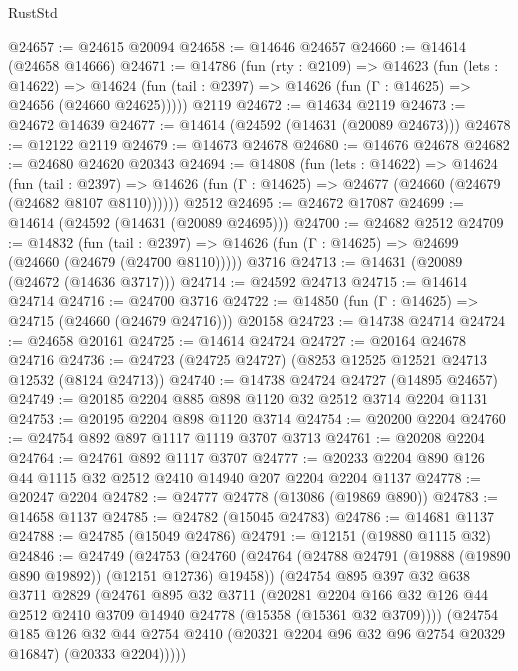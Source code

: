 \begin{lexlean}{RustStd}
\begin{coremodule}
@24657 := @24615 @20094
@24658 := @14646 @24657
@24660 := @14614 (@24658 @14666)
@24671 := @14786
    (fun (rty : @2109) =>
    @14623
      (fun (lets : @14622) =>
      @14624 (fun (tail : @2397) => @14626 (fun (Γ : @14625) => @24656 (@24660 @24625)))))
    @2119
@24672 := @14634 @2119
@24673 := @24672 @14639
@24677 := @14614 (@24592 (@14631 (@20089 @24673)))
@24678 := @12122 @2119
@24679 := @14673 @24678
@24680 := @14676 @24678
@24682 := @24680 @24620 @20343
@24694 := @14808
    (fun (lets : @14622) =>
    @14624
      (fun (tail : @2397) =>
      @14626 (fun (Γ : @14625) => @24677 (@24660 (@24679 (@24682 @8107 @8110))))))
    @2512
@24695 := @24672 @17087
@24699 := @14614 (@24592 (@14631 (@20089 @24695)))
@24700 := @24682 @2512
@24709 := @14832
    (fun (tail : @2397) => @14626 (fun (Γ : @14625) => @24699 (@24660 (@24679 (@24700 @8110)))))
    @3716
@24713 := @14631 (@20089 (@24672 (@14636 @3717)))
@24714 := @24592 @24713
@24715 := @14614 @24714
@24716 := @24700 @3716
@24722 := @14850 (fun (Γ : @14625) => @24715 (@24660 (@24679 @24716))) @20158
@24723 := @14738 @24714
@24724 := @24658 @20161
@24725 := @14614 @24724
@24727 := @20164 @24678 @24716
@24736 := @24723 (@24725 @24727) (@8253 @12525 @12521 @24713 @12532 (@8124 @24713))
@24740 := @14738 @24724 @24727 (@14895 @24657)
@24749 := @20185 @2204 @885 @898 @1120 @32 @2512 @3714 @2204 @1131
@24753 := @20195 @2204 @898 @1120 @3714
@24754 := @20200 @2204
@24760 := @24754 @892 @897 @1117 @1119 @3707 @3713
@24761 := @20208 @2204
@24764 := @24761 @892 @1117 @3707
@24777 := @20233 @2204 @890 @126 @44 @1115 @32 @2512 @2410 @14940 @207 @2204 @2204 @1137
@24778 := @20247 @2204
@24782 := @24777 @24778 (@13086 (@19869 @890))
@24783 := @14658 @1137
@24785 := @24782 (@15045 @24783)
@24786 := @14681 @1137
@24788 := @24785 (@15049 @24786)
@24791 := @12151 (@19880 @1115 @32)
@24846 := @24749
    (@24753
      (@24760
        (@24764 (@24788 @24791 (@19888 (@19890 @890 @19892)) (@12151 @12736) @19458))
        (@24754
          @895
          @397
          @32
          @638
          @3711
          @2829
          (@24761
            @895
            @32
            @3711
            (@20281
              @2204
              @166
              @32
              @126
              @44
              @2512
              @2410
              @3709
              @14940
              @24778
              (@15358 (@15361 @32 @3709))))
          (@24754
            @185
            @126
            @32
            @44
            @2754
            @2410
            (@20321 @2204 @96 @32 @96 @2754 @20329 @16847)
            (@20333 @2204)))))

\end{coremodule}
\end{lexlean}
